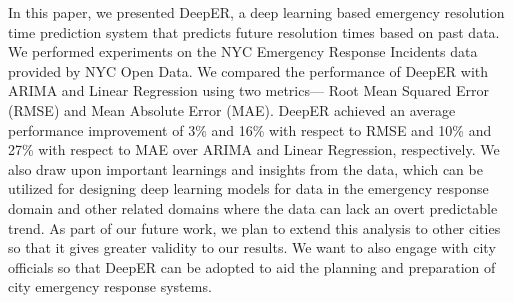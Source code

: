 
In this paper, we presented DeepER, a deep learning based emergency resolution time prediction system that predicts future resolution times based on past data. We performed experiments on the NYC Emergency Response Incidents data provided by NYC Open Data. We compared the performance of DeepER with ARIMA and Linear Regression using two metrics--- Root Mean Squared Error (RMSE) and Mean Absolute Error (MAE). DeepER achieved an average performance improvement of 3\% and 16\% with respect to RMSE and 10\% and 27\% with respect to MAE over ARIMA and Linear Regression, respectively. We also draw upon important learnings and insights from the data, which can be utilized for designing deep learning models for data in the emergency response domain and other related domains where the data can lack an overt predictable trend.
As part of our future work, we plan to extend this analysis to  other cities so that it gives greater validity to our results. We want to also engage with city officials so that DeepER can be adopted to aid the planning and preparation of city emergency response systems.



